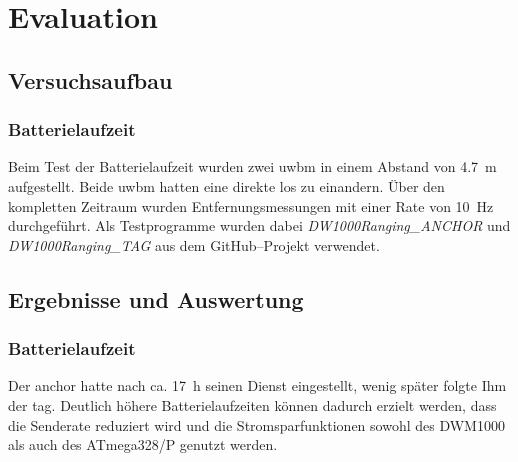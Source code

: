 \begin{comment}
------------------------------------------------------------------------------------------
\end{comment}
\chapter{Evaluation}


\begin{comment}
------------------------------------------------------------------------------------------
\end{comment}
\section{Versuchsaufbau}


\begin{comment}
------------------------------------------------------------------------------------------
TODO: Stimmen die 10Hz?
\end{comment}
\subsection{Batterielaufzeit}

Beim Test der Batterielaufzeit wurden zwei \gls{uwbm} in einem Abstand von \SI{4.7}{\metre} aufgestellt. Beide \gls{uwbm} hatten eine direkte \gls{los} zu einandern. Über den kompletten Zeitraum wurden Entfernungsmessungen mit einer Rate von \SI{10}{\hertz} durchgeführt. Als Testprogramme wurden dabei \textit{DW1000Ranging\_ANCHOR} und \textit{DW1000Ranging\_TAG} aus dem GitHub--Projekt \cite{Trojer2015} verwendet.


\begin{comment}
------------------------------------------------------------------------------------------
\end{comment}
\section{Ergebnisse und Auswertung}


\begin{comment}
------------------------------------------------------------------------------------------
- Start 13:50-23:50, 12:50-20:00 => 10+7 => 17 Stunden
\end{comment}
\subsection{Batterielaufzeit}

Der \gls{anchor} hatte nach ca. \SI{17}{\hour} seinen Dienst eingestellt, wenig später folgte Ihm der \gls{tag}. Deutlich höhere Batterielaufzeiten können dadurch erzielt werden, dass die Senderate reduziert wird und die Stromsparfunktionen sowohl des DWM1000 als auch des ATmega328/P genutzt werden.